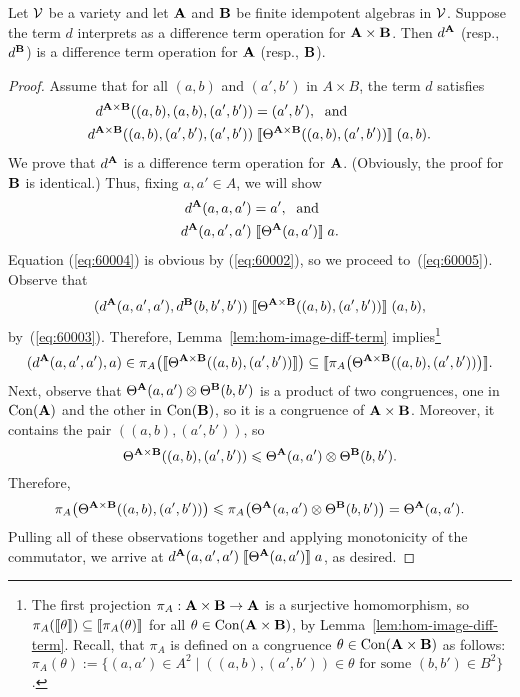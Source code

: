 \pagebreak[1]
\begin{lem}
  \label{lem:products}
  Let $\mathcal{V}$ be a variety and let $\mathbf{A}$ and $\mathbf{B}$ be finite idempotent
  algebras in $\mathcal{V}$. Suppose the term $d$ 
  interprets as a difference term operation for $\mathbf{A}\times \mathbf{B}$.
  Then $d^{\mathbf{A}}$ (resp., $d^{\mathbf{B}}$) is a difference term operation for 
  $\mathbf{A}$  (resp., $\mathbf{B}$).
\end{lem}
\begin{proof}
  Assume that for all $(a, b)$ and $(a', b')$ in $A \times B$, the term $d$ satisfies
  \begin{align}
    d^{\bA \times \bB}((a, b), (a, b), (a', b')) &= (a', b'),\; \text{ and } \label{eq:60002}\\
    d^{\bA \times \bB}((a, b), (a', b'), (a', b'))
    &\comr{\Cg^{\bA \times \bB}((a, b), (a', b'))} (a, b). \label{eq:60003}
  \end{align}
  We prove that $d^{\mathbf{A}}$ is a difference term operation
  for $\mathbf{A}$. (Obviously, the proof for $\mathbf{B}$ is identical.)
  Thus, fixing $a, a' \in A$, we will show 
  \begin{align}
    d^{\bA}(a, a, a') &= a',\; \text{ and } \label{eq:60004}\\
    d^{\bA}(a,a',a')
    &\comr{\Cg^{\bA}(a, a')} a. \label{eq:60005}
  \end{align}
  Equation (\ref{eq:60004}) is obvious by (\ref{eq:60002}),
  so we proceed to~(\ref{eq:60005}).
  Observe that 
  \[
  (d^{\mathbf{A}}(a, a',a'), d^{\mathbf{B}}(b, b',b'))
  \mathrel{\llbracket \Theta^{\mathbf{A} \times \mathbf{B}}((a, b), (a', b')) \rrbracket} (a, b),
  \]
  by~(\ref{eq:60003}). Therefore, Lemma~\ref{lem:hom-image-diff-term}
  implies\footnote{The first projection 
    $\pi_A : \mathbf{A} \times \mathbf{B} \to \mathbf{A}$ is a surjective 
    homomorphism, so 
  $\pi_A(\llbracket \theta \rrbracket) \subseteq \llbracket \pi_A(\theta) \rrbracket$
    for all $\theta \in \operatorname{Con} (\mathbf{A} \times \mathbf{B})$,
    by Lemma~\ref{lem:hom-image-diff-term}. Recall, that
    $\pi_A$ is defined on a congruence $\theta \in \operatorname{Con}(\mathbf{A} \times \mathbf{B})$ as follows:
    $\pi_A(\theta) := \{(a,a') \in A^2 \mid ((a,b),(a',b')) \in \theta \text{ for
      some $(b,b')\in B^2$}\}$.}
  \[
  (d^{\mathbf{A}}(a, a',a'), a)\in \pi_A\bigl(\llbracket \Theta^{\mathbf{A} \times \mathbf{B}}((a, b), (a',
    b')) \rrbracket\bigr)
  \subseteq \llbracket \pi_A\bigl(\Theta^{\mathbf{A} \times \mathbf{B}}((a, b), (a', b'))\bigr) \rrbracket.
  \]
  Next, observe that 
  $\Theta^{\mathbf{A}}(a,a') \otimes \Theta^{\mathbf{B}}(b,b')$  %
  is a product of two congruences, one in $\operatorname{Con}(\mathbf{A})$ and the
  other in $\operatorname{Con}(\mathbf{B})$, so it is a congruence of $\mathbf{A}\times \mathbf{B}$.
  Moreover, it contains the pair $((a,b), (a',b'))$, so
  \[
  \Theta^{\mathbf{A} \times \mathbf{B}}((a, b), (a', b'))\leqslant \Theta^{\mathbf{A}}(a,a') \otimes \Theta^{\mathbf{B}}(b,b').
  \]
  Therefore, 
  \[
  \pi_A\bigl(\Theta^{\mathbf{A} \times \mathbf{B}}((a, b), (a', b'))\bigr)
  \leqslant
  \pi_A\bigl(\Theta^{\mathbf{A}}(a,a') \otimes \Theta^{\mathbf{B}}(b,b')\bigr) = 
  \Theta^{\mathbf{A}}(a,a').
  \]
  Pulling all of these observations together and applying monotonicity of the
  commutator, we arrive at $d^{\mathbf{A}}(a, a',a')  \mathrel{\llbracket \Theta^{\mathbf{A}}(a,a') \rrbracket} a$, as desired.
\end{proof}

